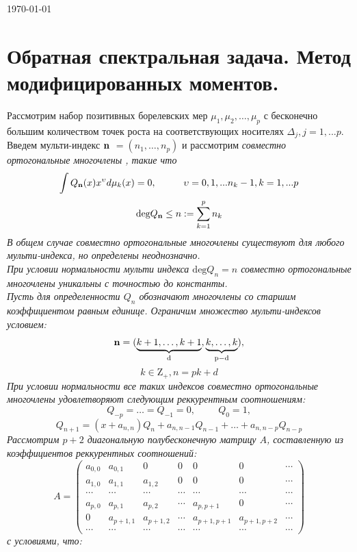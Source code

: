 \documentclass[12pt, a4paper]{report}
\begin{document}
\begin{flushright}
\today
\tableofcontents
\end{flushright}

\chapter {Обратная спектральная задача. Метод модифицированных моментов.}
Рассмотрим набор позитивных борелевских мер
$\mu_1,\mu_2,\ldots,\mu_p$ с бесконечно большим количеством точек
роста на соответствующих носителях
$\Delta_j, j=1,...p$. \\
Введем мульти-индекс $\bf n \rm$ $=(n_1,\ldots,n_p)$ и рассмотрим \it совместно ортогональные многочлены \rm, такие что
$$
\int Q_{ \bf n \rm } (x) x^{\upsilon} d\mu_k(x) = 0, \hspace{1cm} \upsilon = 0,1,... n_k-1, k = 1, ... p 
$$
$$\mbox{deg} Q_{ \bf n \rm} \leq n := \sum\limits_{k=1}^{p} n_k$$
В общем случае совместно ортогональные многочлены существуют для любого мульти-индекса, но определены неоднозначно. \\
При \it условии нормальности \rm мульти индекса $\mbox{deg}Q_n=n$ совместно ортогональные многочлены уникальны с точностью до константы. \\
Пусть для определенности $Q_n$ обозначают многочлены со старшим коэффициентом равным единице. Ограничим множество мульти-индексов условием:
$$\bf n \rm =(\underbrace{k+1,\ldots,k+1}_{d},\underbrace{k,\ldots,k}_{p-d}),$$ $$k\in{\mbox{Z}}_{+},n=pk+d $$
При условии нормальности все таких индексов совместно ортогональные многочлены удовлетворяют следующим реккурентным соотношениям:
$$
Q_{-p}=\ldots=Q_{-1}=0, \hspace{1cm} Q_0=1,
$$
$$
Q_{n+1}=(x+a_{n,n})Q_n+a_{n,n-1}Q_{n-1}+\ldots + a_{n,n-p}Q_{n-p}
$$
Рассмотрим $p+2$ диагональную полубесконечную матрицу $A$, составленную из коэффициентов реккурентных соотношений:
$$
A= \left(\begin{array}{ccccccc}
a_{0,0}&a_{0,1}&0&0&0&0&\cdots\\
a_{1,0}&a_{1,1}&a_{1,2}&0&0&0&\cdots\\
\cdots&\cdots&\cdots&\cdots&\cdots&\cdots&\cdots\\
a_{p,0}&a_{p,1}&a_{p,2}&\cdots&a_{p,p+1}&0&\cdots\\
0&a_{p+1,1}&a_{p+1,2}&\cdots&a_{p+1,p+1}&a_{p+1,p+2}&\cdots\\
\cdots&\cdots&\cdots&\cdots&\cdots&\cdots&\cdots
\end{array}\right)
$$  
с условиями, что:
\end{document}
